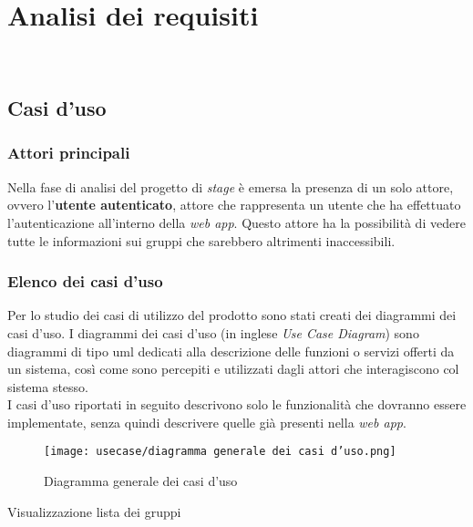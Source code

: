 
\chapter{Analisi dei requisiti}
\label{cap:analisi-requisiti}

\\

\section{Casi d'uso}
\subsection*{Attori principali}
Nella fase di analisi del progetto di \textit{stage} è emersa la presenza di un
solo attore, ovvero l'\textbf{utente autenticato},
attore che rappresenta un utente che ha effettuato l'autenticazione
all'interno della \textit{web app}. Questo attore ha la possibilità di
vedere
tutte le informazioni sui gruppi che sarebbero altrimenti inaccessibili.

\subsection*{Elenco dei casi d'uso}
Per lo studio dei casi di utilizzo del prodotto sono stati creati dei diagrammi
dei casi d'uso.
I diagrammi dei casi d'uso (in inglese \emph{Use Case Diagram}) sono diagrammi
di tipo \gls{uml} dedicati alla descrizione delle funzioni o servizi offerti da
un sistema, così come sono percepiti e utilizzati dagli attori che
interagiscono col sistema stesso.\\
I casi d'uso riportati in seguito descrivono solo le funzionalità che dovranno
essere implementate, senza quindi descrivere quelle già presenti nella
\textit{web app}.
\begin{figure}[H]
    \centerline{\texttt{[image: usecase/diagramma
            generale dei casi d'uso.png]}}
    \caption{Diagramma generale dei casi d'uso}
\end{figure}

\begin{usecase}{Visualizzazione lista dei gruppi}
    \label{uc:scenario-visualizzazione-lista-gruppi}

\end{usecase}
\newpage

